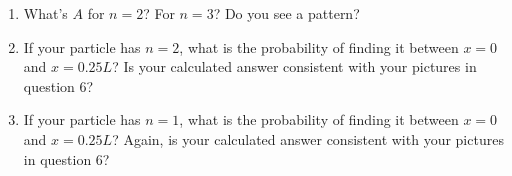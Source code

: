 \begin{enumerate}
\item What's $A$ for $n=2$?  For $n=3$?  Do you see a pattern?
\answerspace{1.7in}

\item If your particle has $n=2$, what is the probability of finding it between $x=0$ and $x=0.25L$?  Is your calculated answer consistent with your pictures in question 6?
\answerspace{1.5in}

\item If your particle has $n=1$, what is the probability of finding it between $x=0$ and $x=0.25L$?  Again, is your calculated answer consistent with your pictures in question 6?
\answerspace{1.5in}

\end{enumerate}



